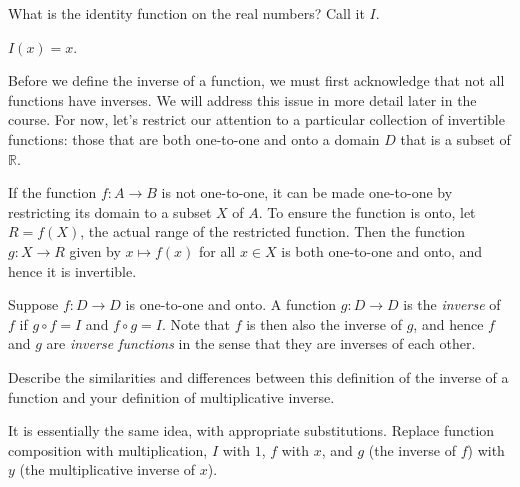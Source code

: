 \documentclass{ximera}
\newcommand{\R}{\mathbb R}
\begin{document}
\begin{question}
What is the identity function on the real numbers?  Call it $I$.  
\begin{freeResponse}
$I(x)=x$.
\end{freeResponse}
\end{question}


Before we define the inverse of a function, we must first acknowledge that not all functions have inverses.  We will address this  issue in more detail later in the course.  For now, let's restrict our attention to a particular collection of invertible functions: those that are both one-to-one and onto a domain $D$ that is a subset of $\R$.  

\begin{remark}
If the function $f:A\rightarrow B$ is not one-to-one, it can be made one-to-one by restricting its domain to a subset $X$ of $A$.  To ensure the function is onto, let $R=f(X)$, the actual range of the restricted function.  Then the function $g:X\rightarrow R$ given by $x\mapsto f(x)$ for all $x\in X$ is both one-to-one and onto, and hence it is invertible.  
\end{remark}

\begin{definition}
Suppose $f:D\rightarrow D$ is one-to-one and onto.  A function $g:D\rightarrow D$ is the \emph{inverse} of $f$ if $g\circ f = I$ and $f\circ g = I$.  Note that $f$ is then also the inverse of $g$, and hence $f$ and $g$ are \emph{inverse functions} in the sense that they are inverses of each other.  
\end{definition}

\begin{question}
Describe the similarities and differences between this definition of the inverse of a function and your definition of multiplicative inverse.  
\begin{freeResponse}
It is essentially the same idea, with appropriate substitutions.  Replace function composition with multiplication, $I$ with $1$, $f$ with $x$, and $g$ (the inverse of $f$) with $y$ (the multiplicative inverse of $x$).  
\end{freeResponse}
\end{question}
\end{document}
